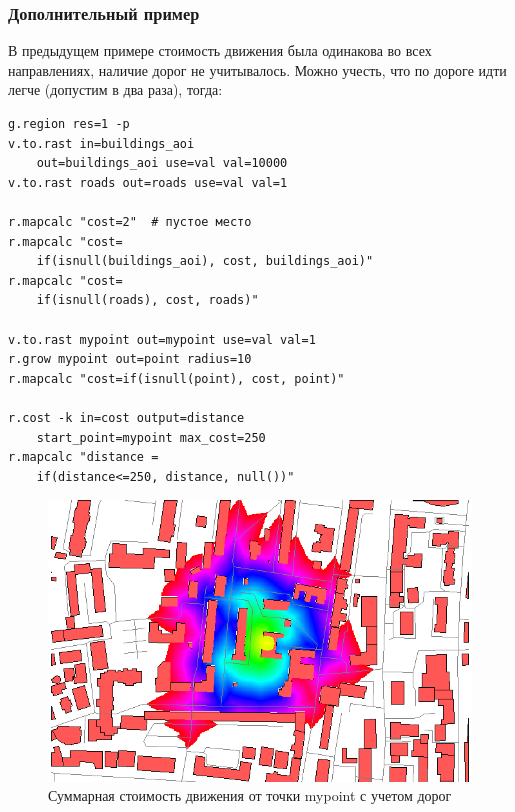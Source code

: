 \begin{frame}
    \frametitle{Дополнительный пример}
    В предыдущем примере стоимость движения была одинакова во всех направлениях, наличие дорог не учитывалось. Можно учесть, что
    по дороге идти легче (допустим в два раза), тогда:
    \begin{verbatim}
g.region res=1 -p
v.to.rast in=buildings_aoi
    out=buildings_aoi use=val val=10000
v.to.rast roads out=roads use=val val=1

r.mapcalc "cost=2"  # пустое место
r.mapcalc "cost=
    if(isnull(buildings_aoi), cost, buildings_aoi)"
r.mapcalc "cost=
    if(isnull(roads), cost, roads)"

v.to.rast mypoint out=mypoint use=val val=1
r.grow mypoint out=point radius=10
r.mapcalc "cost=if(isnull(point), cost, point)"

r.cost -k in=cost output=distance
    start_point=mypoint max_cost=250
r.mapcalc "distance =
    if(distance<=250, distance, null())"
    \end{verbatim}
    \begin{figure}[!ht]
        \begin{center}
            \includegraphics[width=0.9\columnwidth]{./practic/img/cum_cost2}
        \end{center}
        \caption{Суммарная стоимость движения от точки mypoint с учетом дорог}
    \end{figure}
\end{frame}

